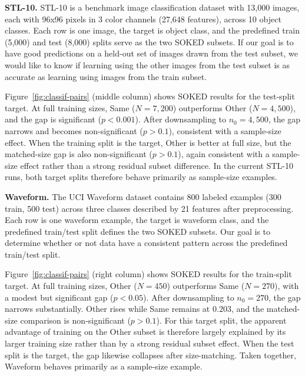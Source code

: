 \documentclass{article}
\begin{document}
\textbf{STL-10.}
STL-10 is a benchmark image classification dataset \citep{coates2011stl10} with 13,000 images, each with 96x96 pixels in 3 color channels (27,648 features), across 10 object classes.
Each row is one image, the target is object class, and the predefined train (5,000) and test (8,000) splits serve as the two SOKED subsets.
If our goal is to have good predictions on a held-out set of images drawn from the test subset, we would like to know if learning using the other images from the test subset is as accurate as learning using images from the train subset.

Figure~\ref{fig:classif-pairs} (middle column) shows SOKED results for the test-split target.
At full training sizes, Same ($N=7{,}200$) outperforms Other ($N=4{,}500$), and the gap is significant ($p < 0.001$).
After downsampling to $n_0 = 4{,}500$, the gap narrows and becomes non-significant ($p > 0.1$), consistent with a sample-size effect.
When the training split is the target, Other is better at full size, but the matched-size gap is also non-significant ($p > 0.1$), again consistent with a sample-size effect rather than a strong residual subset difference.
In the current STL-10 runs, both target splits therefore behave primarily as sample-size examples.

\textbf{Waveform.}
The UCI Waveform dataset \citep{breiman1984classification} contains 800 labeled examples (300 train, 500 test) across three classes described by 21 features after preprocessing.
Each row is one waveform example, the target is waveform class, and the predefined train/test split defines the two SOKED subsets.
Our goal is to determine whether or not data have a consistent pattern across the predefined train/test split. 

Figure~\ref{fig:classif-pairs} (right column) shows SOKED results for the train-split target.
At full training sizes, Other ($N=450$) outperforms Same ($N=270$), with a modest but significant gap ($p < 0.05$).
After downsampling to $n_0 = 270$, the gap narrows substantially. 
Other rises while Same remains at $0.203$, and the matched-size comparison is non-significant ($p > 0.1$).
For this target split, the apparent advantage of training on the Other subset is therefore largely explained by its larger training size rather than by a strong residual subset effect.
When the test split is the target, the gap likewise collapses after size-matching.
Taken together, Waveform behaves primarily as a sample-size example.
\end{document}
